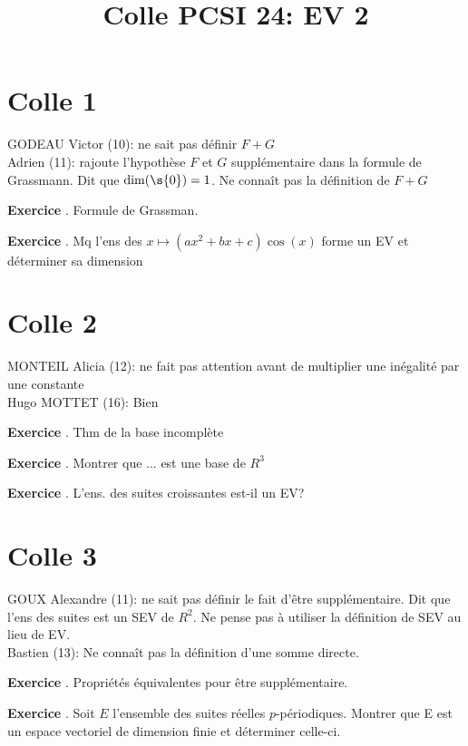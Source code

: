 \documentclass[10pt,a4paper]{article}
\title{Colle PCSI 24: EV 2}
\newcounter{question}
\newcounter{exo}
\newenvironment{exo}{\vspace{0.5cm}\setcounter{question}{0}\addtocounter{exo}{1} \noindent \textbf{Exercice \theexo}. \normalsize }{\par}
\begin{document}
	\maketitle
	
	\section*{Colle 1}
	\setcounter{exo}{0}
	GODEAU Victor (10): ne sait pas définir $F + G$\\
	Adrien (11): rajoute l'hypothèse $F$ et $G$ supplémentaire dans la formule de Grassmann. Dit que $\dim(\s{0}) = 1$. Ne connaît pas la définition de $F + G$\\
	
	\begin{exo}
		Formule de Grassman.
	\end{exo}
		
	\begin{exo}
		Mq l'ens des $x \longmapsto (ax^2 + bx + c)\cos(x)$ forme un EV et déterminer sa dimension
	\end{exo}	
	
	\section*{Colle 2}
	\setcounter{exo}{0}
	MONTEIL Alicia (12): ne fait pas attention avant de multiplier une inégalité par une constante\\
	Hugo MOTTET (16): Bien\\
	
	\begin{exo}
		Thm de la base incomplète
	\end{exo}

	\begin{exo}
		Montrer que ... est une base de $R^3$	
	\end{exo}

	\begin{exo}
		L'ens. des suites croissantes est-il un EV? 
	\end{exo}	

	\section*{Colle 3}
	\setcounter{exo}{0}
	GOUX Alexandre (11): ne sait pas définir le fait d'être supplémentaire. Dit que l'ens des suites est un SEV de $R^2$. Ne pense pas à utiliser la définition de SEV au lieu de EV.\\
	Bastien (13): Ne connaît pas la définition d'une somme directe.\\
	
	\begin{exo}
		Propriétés équivalentes pour être supplémentaire.
	\end{exo}

	\begin{exo}
		Soit $E$ l'ensemble des suites réelles $p$-périodiques.
		Montrer que E est un espace vectoriel de dimension finie et déterminer celle-ci.
	\end{exo}	
\end{document}
